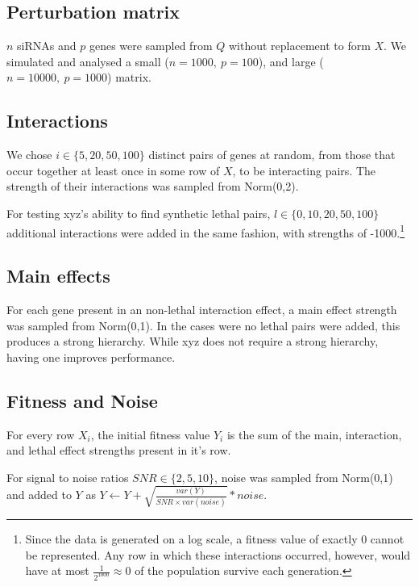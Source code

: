 \subsection{Perturbation matrix}
$n$ siRNAs and $p$ genes were sampled from $Q$ without replacement to form $X$. We simulated and analysed a small ($n = 1000,\ p=100$), and large ($n = 10000,\ p=1000$) matrix.

\subsection{Interactions}
We chose $i \in \{5, 20, 50, 100\}$ distinct pairs of genes at random, from those that occur together at least once in some row of $X$, to be interacting pairs. The strength of their interactions was sampled from Norm(0,2).

For testing xyz's ability to find synthetic lethal pairs, $l \in \{0, 10,20,50,100\}$ additional interactions were added in the same fashion, with strengths of -1000.\footnote{Since the data is generated on a log scale, a fitness value of exactly 0 cannot be represented. Any row in which these interactions occurred, however, would have at most $\frac{1}{2^{1000}} \approx 0$ of the population survive each generation.}


\subsection{Main effects}
For each gene present in an non-lethal interaction effect, a main effect strength was sampled from Norm(0,1). In the cases were no lethal pairs were added, this produces a strong hierarchy. While xyz does not require a strong hierarchy, having one improves performance.\cite{Thanei2016-wf}

\subsection{Fitness and Noise}
For every row $X_i$, the initial fitness value $Y_i$ is the sum of the main, interaction, and lethal effect strengths present in it's row.

For signal to noise ratios $SNR \in \{2,5,10\}$, noise was sampled from Norm(0,1) and added to $Y$ as $Y \leftarrow Y + \sqrt{\frac{var(Y)}{SNR \times var(noise)}} * noise$.

